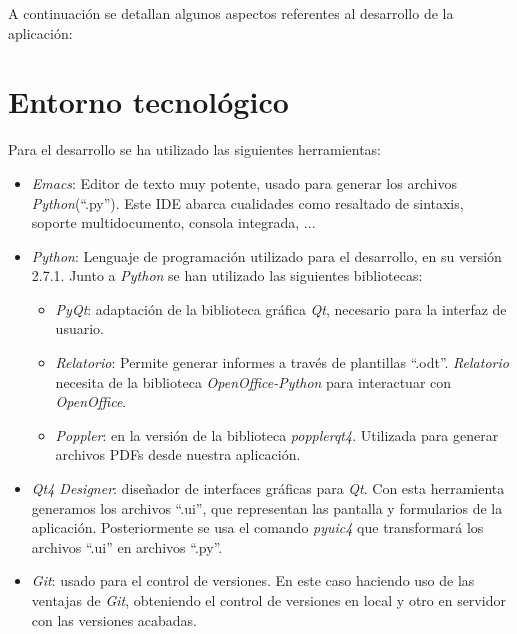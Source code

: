 

A continuación se detallan algunos aspectos referentes al desarrollo de la aplicación:

\section{Entorno tecnológico}
Para el desarrollo se ha utilizado las siguientes herramientas:
\begin{itemize}
\item \textit{Emacs}: Editor de texto muy potente, usado para generar los archivos \textit{Python}(``.py''). Este IDE abarca cualidades como resaltado de sintaxis, soporte multidocumento, consola integrada, ...
\item \textit{Python}: Lenguaje de programación utilizado para el desarrollo, en su versión 2.7.1. Junto a \textit{Python} se han utilizado las siguientes bibliotecas:
\begin{itemize}
\item \textit{PyQt}: adaptación de la biblioteca gráfica \textit{Qt}, necesario para la interfaz de usuario.
\item \textit{Relatorio}: Permite generar informes a través de plantillas ``.odt''. \textit{Relatorio} necesita de la biblioteca \textit{OpenOffice-Python} para interactuar con \textit{OpenOffice}.
\item \textit{Poppler}: en la versión de la biblioteca \textit{popplerqt4}. Utilizada para generar archivos PDFs desde nuestra aplicación.
\end{itemize}
\item \textit{Qt4 Designer}: diseñador de interfaces gráficas para \textit{Qt}. Con esta herramienta generamos los archivos ``.ui'', que representan las pantalla y formularios de la aplicación. Posteriormente se usa el comando \textit{pyuic4} que transformará los archivos ``.ui'' en archivos ``.py''.
\item \textit{Git}: usado para el control de versiones. En este caso haciendo uso de las ventajas de \textit{Git}, obteniendo el control de versiones en local y otro en servidor con las versiones acabadas.
\end{itemize}


